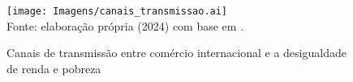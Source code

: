 
\begin{figure}[H]
	\centering
	\caption{Canais de transmissão entre comércio internacional e a desigualdade de renda e pobreza} \label{fig:canais_de_transmissao}
	\texttt{[image: Imagens/canais\_transmissao.ai]} \\
	\footnotesize
	Fonte: elaboração própria (2024) com base em \textcite{bannisterthugge01, xu03, goldbergpavcnik04, banerjee04}.
\end{figure}


